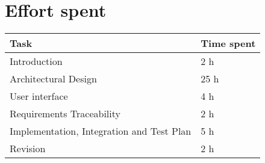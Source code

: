 \chapter{Effort spent}
\begin{tabular}{|l|l|}
	\hline
	Task & Time spent\\
	\hline
	Introduction & 2 h\\
	\hline
	Architectural Design & 25 h\\
	\hline
	User interface & 4 h\\
	\hline
	Requirements Traceability & 2 h\\
	\hline
	Implementation, Integration and Test Plan & 5 h\\
	\hline
	Revision & 2 h\\
	\hline
\end{tabular}
